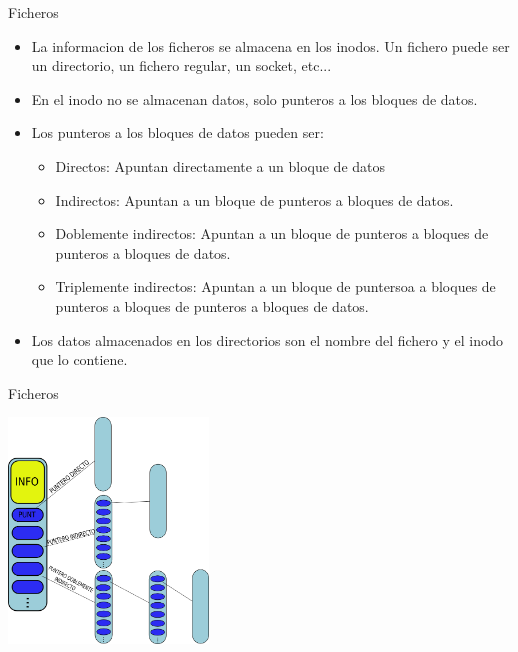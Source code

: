 \begin{frame}{Ficheros}
  \begin{itemize}
    \item La informacion de los ficheros se almacena en los inodos. Un fichero puede ser un directorio, un fichero regular, un socket, etc...
    \item En el inodo no se almacenan datos, solo punteros a los bloques de datos.
    \item Los punteros a los bloques de datos pueden ser:
    \begin{itemize}
      \item Directos: Apuntan directamente a un bloque de datos
      \item Indirectos: Apuntan a un bloque de punteros a bloques de datos.
      \item Doblemente indirectos: Apuntan a un bloque de punteros a bloques de punteros a bloques de datos.
      \item Triplemente indirectos: Apuntan a un bloque de puntersoa a bloques de punteros a bloques de punteros a bloques de datos.
    \end{itemize}
    \item Los datos almacenados en los directorios son el nombre del fichero y el inodo que lo contiene.
  \end{itemize}
\end{frame}

\begin{frame}{Ficheros}
  \begin{center}
    \includegraphics[height=6cm]{imgs/ext_files.png}
  \end{center}
\end{frame}

